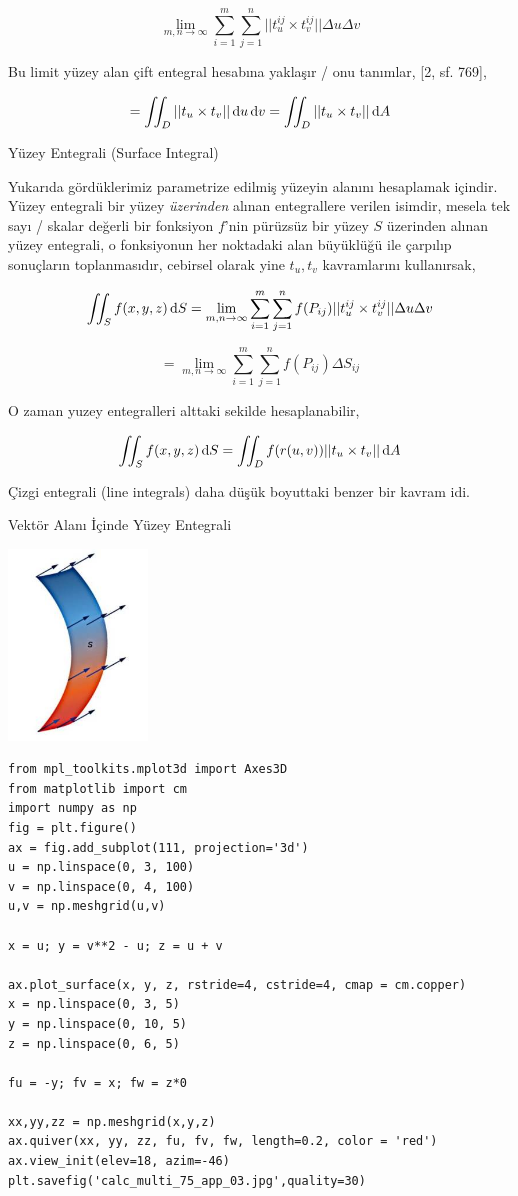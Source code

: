 \documentclass[12pt,fleqn]{article}\usepackage{../../common}
\begin{document}
$$
\lim_{m,n \to \infty} \sum_{i=1}^{m} \sum_{j=1}^{n} || t_u^{ij} \times t_v^{ij} || \Delta u \Delta v
$$

Bu limit yüzey alan çift entegral hesabına yaklaşır / onu tanımlar, [2, sf. 769],

$$
= \iint_D || t_u \times t_v || \,\mathrm{d} u \,\mathrm{d} v = \iint_D || t_u \times t_v || \,\mathrm{d} A
$$

Yüzey Entegrali (Surface Integral)

Yukarıda gördüklerimiz parametrize edilmiş yüzeyin alanını hesaplamak içindir.
Yüzey entegrali bir yüzey {\em üzerinden} alınan entegrallere verilen isimdir,
mesela tek sayı / skalar değerli bir fonksiyon $f$'nin pürüzsüz bir yüzey $S$
üzerinden alınan yüzey entegrali, o fonksiyonun her noktadaki alan büyüklüğü ile
çarpılıp sonuçların toplanmasıdır, cebirsel olarak yine $t_u,t_v$ kavramlarını
kullanırsak,

$$
\iint_S f(x,y,z) \,\mathrm{d} S 
= \lim_{m,n \to \infty} \sum_{i=1}^{m} \sum_{j=1}^{n} f(P_{ij}) || t_u^{ij} \times t_v^{ij} || \Delta u \Delta v
$$

$$
= \lim_{m,n \to \infty} \sum_{i=1}^{m} \sum_{j=1}^{n} f(P_{ij}) \Delta S_{ij} 
$$

O zaman yuzey entegralleri alttaki sekilde hesaplanabilir,

$$
\iint_S f(x,y,z) \,\mathrm{d} S =
\iint_D f(r(u,v)) || t_u \times t_v || \,\mathrm{d} A
$$

Çizgi entegrali (line integrals) daha düşük boyuttaki benzer bir kavram idi.

Vektör Alanı İçinde Yüzey Entegrali

\includegraphics[width=10em]{calc_multi_75_app_04.jpg}


\begin{verbatim}
from mpl_toolkits.mplot3d import Axes3D
from matplotlib import cm
import numpy as np
fig = plt.figure()
ax = fig.add_subplot(111, projection='3d')
u = np.linspace(0, 3, 100)
v = np.linspace(0, 4, 100)
u,v = np.meshgrid(u,v)

x = u; y = v**2 - u; z = u + v

ax.plot_surface(x, y, z, rstride=4, cstride=4, cmap = cm.copper)
x = np.linspace(0, 3, 5)
y = np.linspace(0, 10, 5)
z = np.linspace(0, 6, 5)

fu = -y; fv = x; fw = z*0

xx,yy,zz = np.meshgrid(x,y,z)
ax.quiver(xx, yy, zz, fu, fv, fw, length=0.2, color = 'red')
ax.view_init(elev=18, azim=-46)
plt.savefig('calc_multi_75_app_03.jpg',quality=30)
\end{verbatim}
\end{document}
